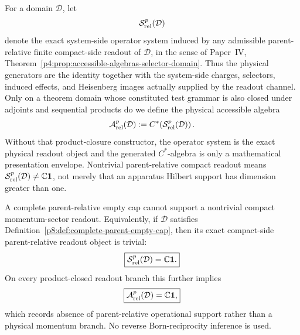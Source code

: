 \documentclass[12pt,a4paper]{article}
\begin{document}
\begin{definition}
\label{p8:def:compact-parent-readout-operator-system}
For a domain \(\mathcal D\), let
\[
 \mathcal S^{p}_{\rm rel}(\mathcal D)
\]
denote the exact system-side operator system induced by any admissible
parent-relative finite compact-side readout of \(\mathcal D\), in the sense of
Paper~IV, Theorem~\ref{p4:prop:accessible-algebras-selector-domain}.  Thus the
physical generators are the identity together with the system-side charges,
selectors, induced effects, and Heisenberg images actually supplied by the
readout channel.  Only on a theorem domain whose constituted test grammar is
also closed under adjoints and sequential products do we define the physical
accessible algebra
\[
 \mathcal A^{p}_{\rm rel}(\mathcal D)
 :=C^*\!\left(\mathcal S^{p}_{\rm rel}(\mathcal D)\right).
\]
Without that product-closure constructor, the operator system is the exact
physical readout object and the generated \(C^*\)-algebra is only a
mathematical presentation envelope.  Nontrivial parent-relative compact
readout means
\(\mathcal S^{p}_{\rm rel}(\mathcal D)\neq\mathbb C\mathbf1\), not merely that
an apparatus Hilbert support has dimension greater than one.
\end{definition}

\begin{theorem}
\label{p8:thm:reciprocal-empty-void-nogo}
A complete parent-relative empty cap cannot support a nontrivial compact
momentum-sector readout.  Equivalently, if \(\mathcal D\) satisfies
Definition~\ref{p8:def:complete-parent-empty-cap}, then its exact compact-side
parent-relative readout object is trivial:
\begin{equation}
\label{p8:eq:empty-cap-compact-operator-system}
 \boxed{\mathcal S^{p}_{\rm rel}(\mathcal D)=\mathbb C\mathbf1.}
\end{equation}
On every product-closed readout branch this further implies
\begin{equation}
\label{p8:eq:empty-cap-compact-image}
 \boxed{\mathcal A^{p}_{\rm rel}(\mathcal D)=\mathbb C\mathbf1,}
\end{equation}
which records absence of parent-relative operational support rather than a
physical momentum branch.  No reverse Born-reciprocity inference is used.
\end{theorem}
\end{document}
